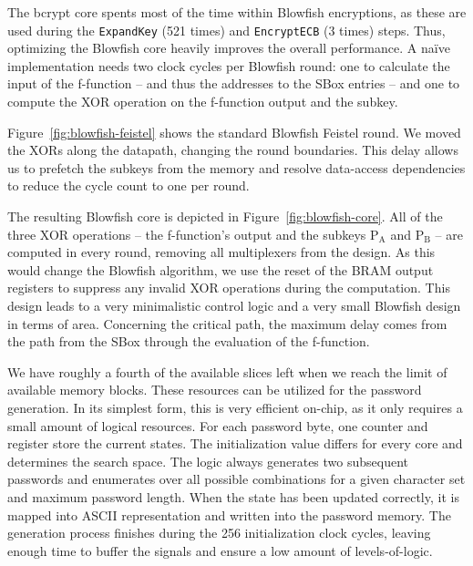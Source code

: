 The bcrypt core spents most of the time within Blowfish encryptions, as these
are used during the \texttt{ExpandKey} (521 times) and \texttt{EncryptECB} (3
times) steps. Thus, optimizing the Blowfish core heavily improves the overall
performance. A na\"ive implementation needs two clock cycles per Blowfish round:
one to calculate the input of the f-function -- and thus the addresses to the
SBox entries -- and one to compute the XOR operation on the f-function output
and the subkey.

Figure~\ref{fig:blowfish-feistel} shows the standard Blowfish Feistel round. We
moved the XORs along the datapath, changing the round boundaries. This delay
allows us to prefetch the subkeys from the memory and resolve data-access
dependencies to reduce the cycle count to one per round.

The resulting Blowfish core is depicted in Figure~\ref{fig:blowfish-core}. All
of the three XOR operations -- the f-function's output and the subkeys
$\text{P}_\text{A}$ and $\text{P}_\text{B}$ -- are computed in every round,
removing all multiplexers from the design. As this would change the Blowfish
algorithm, we use the reset of the BRAM output registers to suppress any invalid
XOR operations during the computation. This design leads to a very minimalistic
control logic and a very small Blowfish design in terms of area. Concerning the
critical path, the maximum delay comes from the path from the SBox through the
evaluation of the f-function.

We have roughly a fourth of the available slices left when we reach the limit of
available memory blocks. These resources can be utilized for the password
generation. In its simplest form, this is very efficient on-chip, as it only
requires a small amount of logical resources.
For each  password byte, one counter and register store the current states. The
initialization value differs for every core and determines the search space. The
logic always generates two subsequent passwords and enumerates over all possible
combinations for a given character set and maximum password length. When the
state has been updated correctly, it is mapped into ASCII representation and
written into the password memory. The generation process finishes during the 256
initialization clock cycles, leaving enough time to buffer the signals and
ensure a low amount of levels-of-logic.

